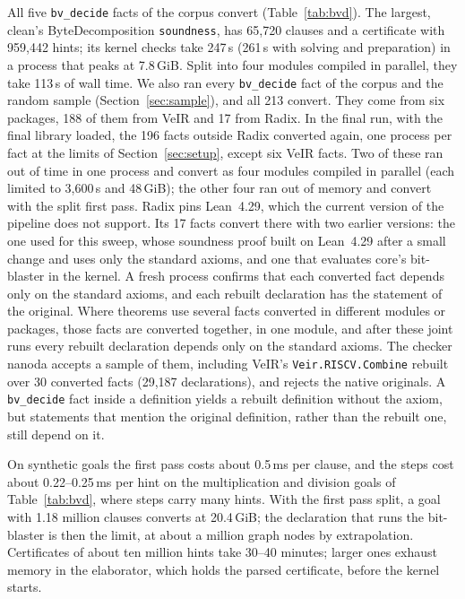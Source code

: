 \documentclass[11pt]{article}
\begin{document}
All five \texttt{bv\_decide} facts of the corpus convert (Table~\ref{tab:bvd}). The largest, clean's
ByteDecomposition \texttt{soundness}, has 65,720 clauses and a certificate with 959,442 hints; its
kernel checks take 247\,s (261\,s with solving and preparation) in a process that peaks at 7.8\,GiB.
Split into four modules compiled in parallel, they take 113\,s of wall time. We also ran every \texttt{bv\_decide}
fact of the corpus and the random sample (Section~\ref{sec:sample}), and all 213 convert. They come
from six packages, 188 of them from VeIR and 17 from Radix. In the final run, with the final library
loaded, the 196 facts outside Radix converted again, one process per fact at the limits of
Section~\ref{sec:setup}, except six
VeIR facts. Two of these ran out of time in one process and convert as four modules compiled in parallel
(each limited to 3,600\,s and 48\,GiB); the other four ran out of memory and convert with the split first
pass. Radix pins Lean~4.29, which
the current version of the pipeline does not support. Its 17 facts convert there with two earlier
versions: the one used for this sweep, whose soundness proof built on Lean~4.29 after a small change
and uses only the standard axioms, and one that evaluates core's bit-blaster in the kernel. A fresh process
confirms that each converted fact depends only on the standard axioms, and each rebuilt declaration has the
statement of the original. Where theorems use several facts converted in different modules or packages, those facts
are converted together, in one module, and after these joint runs every rebuilt declaration depends
only on the standard axioms. The checker nanoda
accepts a sample of them, including VeIR's \texttt{Veir.RISCV.Combine} rebuilt over 30 converted
facts (29,187 declarations), and rejects the native originals. A \texttt{bv\_decide} fact inside a
definition yields a rebuilt definition without the axiom, but statements that mention the original
definition, rather than the rebuilt one, still depend on it.

On synthetic goals the first pass costs about 0.5\,ms per clause, and the steps cost about 0.22--0.25\,ms
per hint on the multiplication and division goals of Table~\ref{tab:bvd}, where steps carry many hints.
With the first pass split, a goal with 1.18 million clauses converts at 20.4\,GiB; the declaration that
runs the bit-blaster is then the limit, at about a million graph nodes by extrapolation. Certificates of
about ten million hints take 30--40 minutes; larger ones exhaust memory in the elaborator, which holds
the parsed certificate, before the kernel starts.
\end{document}

